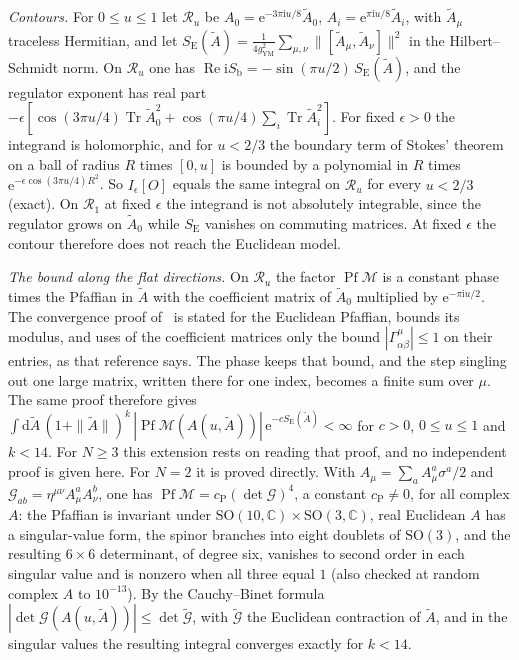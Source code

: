 \emph{Contours.} For \(0\le u\le1\) let \(\mathcal R_u\) be \(A_0=\mathrm e^{-3\pi\mathrm iu/8}\tilde A_0\), \(A_i=\mathrm e^{\pi\mathrm iu/8}\tilde A_i\), with \(\tilde A_\mu\) traceless Hermitian, and let \(S_{\mathrm E}(\tilde A)=\tfrac1{4g_{\mathrm{YM}}^2}\sum_{\mu,\nu}\|[\tilde A_\mu,\tilde A_\nu]\|^2\) in the Hilbert--Schmidt norm. On \(\mathcal R_u\) one has \(\operatorname{Re}\mathrm iS_{\mathrm b}=-\sin(\pi u/2)\,S_{\mathrm E}(\tilde A)\), and the regulator exponent has real part \(-\epsilon[\cos(3\pi u/4)\operatorname{Tr}\tilde A_0^2+\cos(\pi u/4)\sum_i\operatorname{Tr}\tilde A_i^2]\). For fixed \(\epsilon>0\) the integrand is holomorphic, and for \(u<2/3\) the boundary term of Stokes' theorem on a ball of radius \(R\) times \([0,u]\) is bounded by a polynomial in \(R\) times \(\mathrm e^{-\epsilon\cos(3\pi u/4)R^2}\). So \(I_\epsilon[O]\) equals the same integral on \(\mathcal R_u\) for every \(u<2/3\) (exact). On \(\mathcal R_1\) at fixed \(\epsilon\) the integrand is not absolutely integrable, since the regulator grows on \(\tilde A_0\) while \(S_{\mathrm E}\) vanishes on commuting matrices. At fixed \(\epsilon\) the contour therefore does not reach the Euclidean model.

\emph{The bound along the flat directions.} On \(\mathcal R_u\) the factor \(\operatorname{Pf}\mathcal M\) is a constant phase times the Pfaffian in \(\tilde A\) with the coefficient matrix of \(\tilde A_0\) multiplied by \(\mathrm e^{-\pi\mathrm iu/2}\). The convergence proof of~\cite{AustingWheater2001} is stated for the Euclidean Pfaffian, bounds its modulus, and uses of the coefficient matrices only the bound \(|\Gamma^\mu_{\alpha\beta}|\le1\) on their entries, as that reference says. The phase keeps that bound, and the step singling out one large matrix, written there for one index, becomes a finite sum over \(\mu\). The same proof therefore gives \(\int\mathrm d\tilde A\,(1+\|\tilde A\|)^k\,|\operatorname{Pf}\mathcal M(A(u,\tilde A))|\,\mathrm e^{-cS_{\mathrm E}(\tilde A)}<\infty\) for \(c>0\), \(0\le u\le1\) and \(k<14\). For \(N\ge3\) this extension rests on reading that proof, and no independent proof is given here. For \(N=2\) it is proved directly. With \(A_\mu=\sum_aA_\mu^a\sigma^a/2\) and \(\mathcal G_{ab}=\eta^{\mu\nu}A_\mu^aA_\nu^b\), one has \(\operatorname{Pf}\mathcal M=c_{\mathrm P}(\det\mathcal G)^4\), a constant \(c_{\mathrm P}\neq0\), for all complex \(A\): the Pfaffian is invariant under \(\mathrm{SO}(10,\mathbb C)\times\mathrm{SO}(3,\mathbb C)\), real Euclidean \(A\) has a singular-value form, the spinor branches into eight doublets of \(\mathrm{SO}(3)\), and the resulting \(6\times6\) determinant, of degree six, vanishes to second order in each singular value and is nonzero when all three equal \(1\) (also checked at random complex \(A\) to \(10^{-13}\)). By the Cauchy--Binet formula \(|\det\mathcal G(A(u,\tilde A))|\le\det\tilde{\mathcal G}\), with \(\tilde{\mathcal G}\) the Euclidean contraction of \(\tilde A\), and in the singular values the resulting integral converges exactly for \(k<14\).

